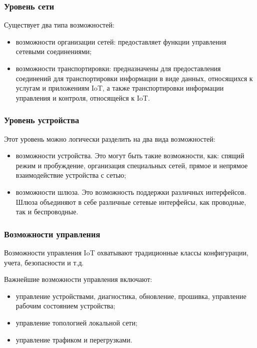 
\subsubsection{Уровень сети}

Существует два типа возможностей:

\begin{itemize}
	\item возможности организации сетей: предоставляет функции управления 
сетевыми соединениями;
	\item возможности транспортировки: предназначены для предоставления 
соединений для транспортировки информации в виде данных, относящихся к услугам и 
приложениям IoT, а также транспортировки информации управления и контроля, 
относящейся к IoT.
\end{itemize}


\subsubsection{Уровень устройства}

Этот уровень можно логически разделить на два вида возможностей:
\begin{itemize}
	\item возможности устройства. Это могут быть такие возможности, как: 
спящий режим и пробуждение, организация специальных сетей, прямое и непрямое 
взаимодействие устройства с сетью;
	\item возможности шлюза. Это возможность поддержки различных 
интерфейсов. Шлюза объединяют в себе различные сетевые интерфейсы, как 
проводные, так и беспроводные.
\end{itemize}


\subsubsection{Возможности управления}

Возможности управления IoT охватывают традиционные классы конфигурации, учета, 
безопасности и т.д.

Важнейшие возможности управления включают:
\begin{itemize}
	\item управление устройствами, диагностика, обновление, прошивка, 
управление рабочим состоянием устройства;
	\item управление топологией локальной сети;
	\item управление трафиком и перегрузками.
\end{itemize}

